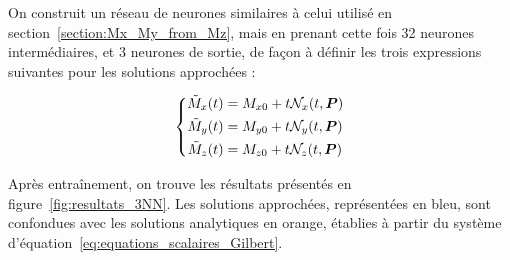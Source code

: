 \documentclass[12pt]{report}
\begin{document}
On construit un réseau de neurones similaires à celui utilisé en section~\ref{section:Mx_My_from_Mz}, mais en prenant cette fois 32 neurones intermédiaires, et 3 neurones de sortie, de façon à définir les trois expressions suivantes pour les solutions approchées : 

\begin{equation}
    \left\{
        \begin{aligned}
            \Tilde{M}_x(t) &= M_{x0} + t\mathcal{N}_x(t, \bm{P}) \\
            \Tilde{M}_y(t) &= M_{y0} + t\mathcal{N}_y(t, \bm{P})\\
            \Tilde{M}_z(t) &= M_{z0} + t\mathcal{N}_z(t, \bm{P})
        \end{aligned}
    \right.
    \label{eq:forme_solutions_3NN}
\end{equation}


Après entraînement, on trouve les résultats présentés en figure~\ref{fig:resultats_3NN}. 
Les solutions approchées, représentées en bleu, sont confondues avec les solutions analytiques en orange, établies à partir du système d'équation~\ref{eq:equations_scalaires_Gilbert}.
\end{document}
